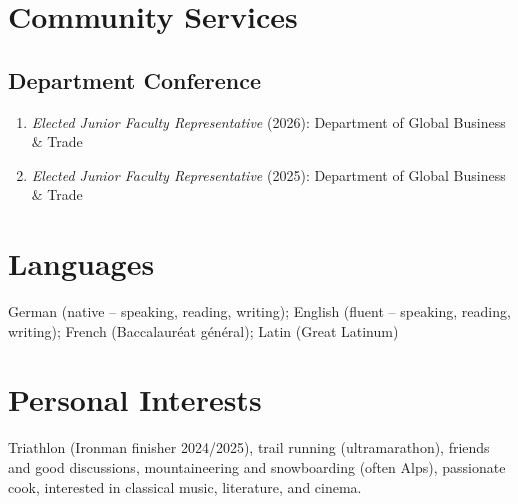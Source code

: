 \documentclass[11pt,a4paper]{article}
\newif\ifREFs%
\begin{document}
\begin{cv}
\section{Community Services}
\subsection{Department Conference}
\begin{cvlist}{}
\item \begin{enumerate}[leftmargin=-2cm]
        \item \textit{Elected Junior Faculty Representative} {(2026)}: Department of Global Business \& Trade
        \item \textit{Elected Junior Faculty Representative} {(2025)}: Department of Global Business \& Trade
    \end{enumerate}
\end{cvlist}

\section{Languages}
German (native -- speaking, reading, writing); English (fluent -- speaking, reading, writing); French (Baccalauréat général); Latin (Great Latinum)

\section{Personal Interests}
Triathlon (Ironman finisher 2024/2025), trail running (ultramarathon), friends and good discussions, mountaineering and snowboarding (often Alps), passionate cook, interested in classical music, literature, and cinema.


\ifREFs%

\end{cv}
\end{document}

